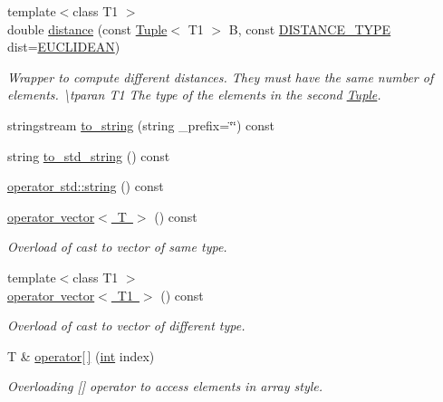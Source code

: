 \begin{DoxyCompactItemize}
{\footnotesize template$<$class T1 $>$ }\\double \mbox{\hyperlink{class_tuple_af47521571361439c96392dee70a79cc7}{distance}} (const \mbox{\hyperlink{class_tuple}{Tuple}}$<$ T1 $>$ B, const \mbox{\hyperlink{maths_8hh_ac50d7263b1cae8691420b86282b27f90}{D\+I\+S\+T\+A\+N\+C\+E\+\_\+\+T\+Y\+PE}} dist=\mbox{\hyperlink{maths_8hh_ac50d7263b1cae8691420b86282b27f90a81bbbc4428c3ff3f1327e94957e2b5f1}{E\+U\+C\+L\+I\+D\+E\+AN}})
\begin{DoxyCompactList}\small\item\em Wrapper to compute different distances. They must have the same number of elements. \textbackslash{}tparan T1 The type of the elements in the second \mbox{\hyperlink{class_tuple}{Tuple}}. \end{DoxyCompactList}\item 
stringstream \mbox{\hyperlink{class_tuple_a029b06891c82353ae40c13199830e90a}{to\+\_\+string}} (string \+\_\+prefix=\char`\"{}\char`\"{}) const
\item 
string \mbox{\hyperlink{class_tuple_a2c8e5f6fb1abb2b11ab222b7ce772569}{to\+\_\+std\+\_\+string}} () const
\item 
\mbox{\hyperlink{class_tuple_a9a4516890830c7a8bf96c9325718c8c3}{operator std\+::string}} () const
\item 
\mbox{\hyperlink{class_tuple_a4189d6fe009e00fbc81061bcad9ee856}{operator vector$<$ T $>$}} () const
\begin{DoxyCompactList}\small\item\em Overload of cast to vector of same type. \end{DoxyCompactList}\item 
{\footnotesize template$<$class T1 $>$ }\\\mbox{\hyperlink{class_tuple_a924a25df1578ffab148c69a1a1000491}{operator vector$<$ T1 $>$}} () const
\begin{DoxyCompactList}\small\item\em Overload of cast to vector of different type. \end{DoxyCompactList}\item 
T \& \mbox{\hyperlink{class_tuple_ae18a93053af932997709798b3fd5d12d}{operator\mbox{[}$\,$\mbox{]}}} (\mbox{\hyperlink{draw_8hh_aa620a13339ac3a1177c86edc549fda9b}{int}} index)
\begin{DoxyCompactList}\small\item\em Overloading \mbox{[}\mbox{]} operator to access elements in array style. \end{DoxyCompactList}\item 

\end{DoxyCompactItemize}
